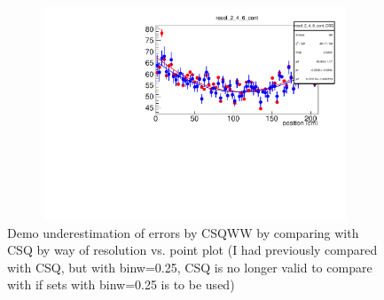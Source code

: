 \documentclass[12pt]{article}
\begin{document}
\begin{figure}[ht]
	\includegraphics[height=2.5in,width=5.5in]{res_vs_pstn.pdf}
	\caption{Demo underestimation of errors by CSQWW by comparing with CSQ by way of resolution vs. point plot (I had previously compared with CSQ, but with binw=0.25, CSQ is no longer valid to compare with if sets with binw=0.25 is to be used) }
	\label{fig4}
\end{figure}  

\clearpage
\end{document}
